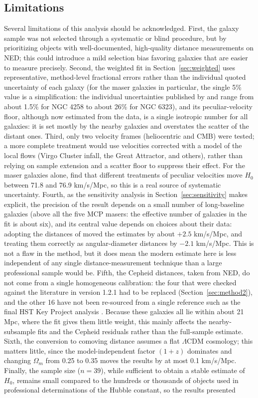 \documentclass[11pt]{article}
\begin{document}
\subsection{Limitations}
\label{sec:limitations}
Several limitations of this analysis should be acknowledged. First, the galaxy sample was not selected through a systematic or blind procedure, but by prioritizing objects with well-documented, high-quality distance measurements on NED; this could introduce a mild selection bias favoring galaxies that are easier to measure precisely. Second, the weighted fit in Section~\ref{sec:weighted} uses representative, method-level fractional errors rather than the individual quoted uncertainty of each galaxy (for the maser galaxies in particular, the single 5\% value is a simplification: the individual uncertainties published by \citet{pesce2020} and \citet{reid2019} range from about 1.5\% for NGC 4258 to about 26\% for NGC 6323), and its peculiar-velocity floor, although now estimated from the data, is a single isotropic number for all galaxies: it is set mostly by the nearby galaxies and overstates the scatter of the distant ones. Third, only two velocity frames (heliocentric and CMB) were tested; a more complete treatment would use velocities corrected with a model of the local flows (Virgo Cluster infall, the Great Attractor, and others), rather than relying on sample extension and a scatter floor to suppress their effect. For the maser galaxies alone, \citet{pesce2020} find that different treatments of peculiar velocities move $H_0$ between 71.8 and 76.9 km/s/Mpc, so this is a real source of systematic uncertainty. Fourth, as the sensitivity analysis in Section~\ref{sec:sensitivity} makes explicit, the precision of the result depends on a small number of long-baseline galaxies (above all the five MCP masers: the effective number of galaxies in the fit is about six), and its central value depends on choices about their data: adopting the distances of \citet{pesce2020} moved the estimates by about $+2.5$ km/s/Mpc, and treating them correctly as angular-diameter distances by $-2.1$ km/s/Mpc. This is not a flaw in the method, but it does mean the modern estimate here is less independent of any single distance-measurement technique than a large professional sample would be. Fifth, the Cepheid distances, taken from NED, do not come from a single homogeneous calibration: the four that were checked against the literature in version 1.2.1 had to be replaced (Section~\ref{sec:method2}), and the other 16 have not been re-sourced from a single reference such as the final HST Key Project analysis \citep{freedman2001}. Because these galaxies all lie within about 21 Mpc, where the fit gives them little weight, this mainly affects the nearby-subsample fits and the Cepheid residuals rather than the full-sample estimate. Sixth, the conversion to comoving distance assumes a flat $\Lambda$CDM cosmology; this matters little, since the model-independent factor $(1+z)$ dominates and changing $\Omega_m$ from 0.25 to 0.35 moves the results by at most 0.1 km/s/Mpc. Finally, the sample size ($n=39$), while sufficient to obtain a stable estimate of $H_0$, remains small compared to the hundreds or thousands of objects used in professional determinations of the Hubble constant, so the results presented 
\end{document}
